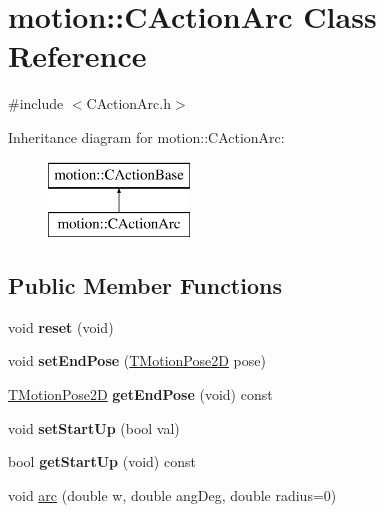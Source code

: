 \hypertarget{classmotion_1_1CActionArc}{}\section{motion\+:\+:C\+Action\+Arc Class Reference}
\label{classmotion_1_1CActionArc}


{\ttfamily \#include $<$C\+Action\+Arc.\+h$>$}

Inheritance diagram for motion\+:\+:C\+Action\+Arc\+:\begin{figure}[H]
\begin{center}
\leavevmode
\includegraphics[height=2.000000cm]{classmotion_1_1CActionArc}
\end{center}
\end{figure}
\subsection*{Public Member Functions}
\begin{DoxyCompactItemize}
\item 
\mbox{\label{classmotion_1_1CActionArc_a7b8746c8652bb865f2b606608dffbb16}} 
void {\bfseries reset} (void)
\item 
\mbox{\label{classmotion_1_1CActionArc_ad6f08adc549f8d19892e0a6a257415dc}} 
void {\bfseries set\+End\+Pose} (\mbox{\hyperlink{structmotion_1_1TMotionPose2D}{T\+Motion\+Pose2D}} pose)
\item 
\mbox{\label{classmotion_1_1CActionArc_ab368fc3d7a9080a81c54df7c3cac5d8b}} 
\mbox{\hyperlink{structmotion_1_1TMotionPose2D}{T\+Motion\+Pose2D}} {\bfseries get\+End\+Pose} (void) const
\item 
\mbox{\label{classmotion_1_1CActionArc_a6af47c85b3b8226b6ae5bc3e27185e77}} 
void {\bfseries set\+Start\+Up} (bool val)
\item 
\mbox{\label{classmotion_1_1CActionArc_af91ab904a344a373610e73178bfa8203}} 
bool {\bfseries get\+Start\+Up} (void) const
\item 
void \mbox{\hyperlink{classmotion_1_1CActionArc_a64a6fc339df29d196786291f02b2802e}{arc}} (double w, double ang\+Deg, double radius=0)
\end{DoxyCompactItemize}
